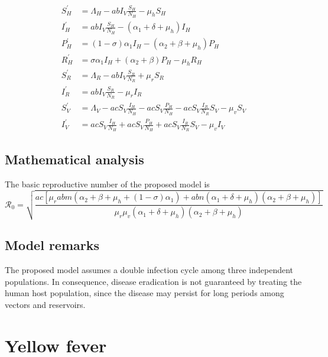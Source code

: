\documentclass{book}
\begin{document}
\begin{equation}
\begin{split}
S_{H}^{\prime}&=\Lambda_{H}-a b I_{V} \frac{S_{H}}{N_{H}}-\mu_{h} S_{H} \\
I_{H}^{\prime}&=a b I_{V} \frac{S_{H}}{N_{H}}-\left(\alpha_{1}+\delta+\mu_{h}\right) I_{H} \\
P_{H}^{\prime}&=(1-\sigma) \alpha_{1} I_{H}-\left(\alpha_{2}+\beta+\mu_{h}\right) P_{H} \\
R_{H}^{\prime}&=\sigma \alpha_{1} I_{H}+\left(\alpha_{2}+\beta\right) P_{H}-\mu_{h} R_{H} \\
S_{R}^{\prime}&=\Lambda_{R}-a b I_{V} \frac{S_{R}}{N_{R}}+\mu_{r} S_{R} \\
I_{R}^{\prime}&=a b I_{V} \frac{S_{R}}{N_{R}}-\mu_{r} I_{R} \\
S_{V}^{\prime}&=\Lambda_{V}-a c S_{V} \frac{I_{H}}{N_{H}}-a c S_{V} \frac{P_{H}}{N_{H}}-a c S_{V} \frac{I_{R}}{N_{R}} S_{V}-\mu_{v} S_{V} \\
I_{V}^{\prime}&=a c S_{V} \frac{I_{H}}{N_{H}}+a c S_{V} \frac{P_{H}}{N_{H}}+a c S_{V} \frac{I_{R}}{N_{R}} S_{V}-\mu_{v} I_{V}
\end{split}
\end{equation}

\subsection*{Mathematical analysis}
The basic reproductive number of the proposed model is
\begin{equation}
\mathcal{R}_0=
\sqrt{\frac{a c\left[\mu_{r} a b m\left(\alpha_{2}+\beta+\mu_{h}+(1-\sigma) \alpha_{1}\right)+a b n\left(\alpha_{1}+\delta+\mu_{h}\right)\left(\alpha_{2}+\beta+\mu_{h}\right)\right]}{\mu_{r} \mu_{v}\left(\alpha_{1}+\delta+\mu_{h}\right)\left(\alpha_{2}+\beta+\mu_{h}\right)}}
\end{equation}

\subsection*{Model remarks}
The proposed model assumes a double infection cycle among three independent populations. In consequence, disease eradication is not guaranteed by treating the human host population, since the disease may persist for long periods among vectors and reservoirs.

\section{Yellow fever}
\end{document}
